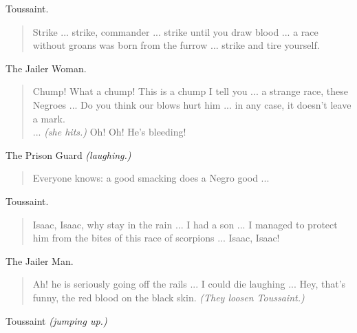 \documentclass[letterpaper,article,12pt,oneside,notitlepage]{memoir}
\begin{document}
\clearpage

\begin{center}Toussaint.\end{center}

\begin{verse}
Strike ... strike, commander ... strike until you draw blood ... a race without groans was born from the furrow ... strike and tire yourself.  \\
\end{verse}

\begin{center}The Jailer Woman.\end{center}

\begin{verse}
Chump! What a chump! This is a chump I tell you ... a strange race, these Negroes ... Do you think our blows hurt him ... in any case, it doesn't leave a mark.  \\
... \textit{(she hits.)} Oh! Oh! He's bleeding! \\
\end{verse}

\begin{center}The Prison Guard  \textit{(laughing.)}\end{center}

\begin{verse}
Everyone knows: a good smacking does a Negro good ... \\
\end{verse}

\begin{center}Toussaint.\end{center}

\begin{verse}
Isaac, Isaac, why stay in the rain ... I had a son ... I managed to protect him from the bites of this race of scorpions ... Isaac, Isaac!  \\
\end{verse}

\begin{center}The Jailer Man.\end{center}

\begin{verse}
Ah! he is seriously going off the rails ... I could die laughing ... Hey, that's funny, the red blood on the black skin. \textit{(They loosen Toussaint.)}  \\
\end{verse}

\begin{center}Toussaint \textit{(jumping up.)}\end{center}
\end{document}
